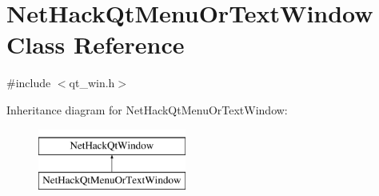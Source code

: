 \hypertarget{classNetHackQtMenuOrTextWindow}{\section{Net\+Hack\+Qt\+Menu\+Or\+Text\+Window Class Reference}
\label{classNetHackQtMenuOrTextWindow}
}


{\ttfamily \#include $<$qt\+\_\+win.\+h$>$}

Inheritance diagram for Net\+Hack\+Qt\+Menu\+Or\+Text\+Window\+:\begin{figure}[H]
\begin{center}
\leavevmode
\includegraphics[height=2.000000cm]{classNetHackQtMenuOrTextWindow}
\end{center}
\end{figure}
